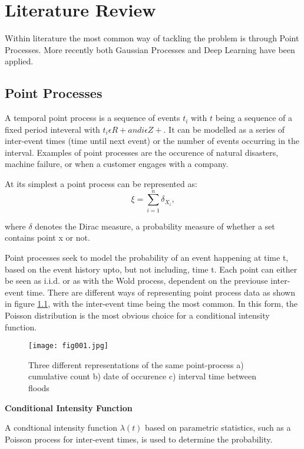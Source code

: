 
\chapter{Literature Review} %

\label{Chapter2} %

Within literature the most common way of tackling the problem is through Point Processes. More recently both Gaussian Processes and Deep Learning have been applied.

\section{Point Processes}
A temporal point process is a sequence of events ${t_i}$ with $t$ being a sequence of a fixed period inteveral with $t_i \epsilon R + and i \epsilon Z+$. It can be modelled as a series of inter-event times (time until next event) or the number of events occurring in the interval. Examples of point processes are the occurence of natural disasters, machine failure, or when a customer engages with a company.

At its simplest a point process can be represented as:
$${\xi =\sum _{i=1}^{n}\delta _{X_{i}},}$$

where $\delta$ denotes the Dirac measure, a probability measure of whether a set contains point x or not.

Point processes seek to model the probability of an event happening at time t, based on the event history upto, but not including, time t. Each point can either be seen as i.i.d. or as with the Wold process, dependent on the previouse inter-event time.
There are different ways of representing point process data as shown in figure \ref{fig:boat1}, with the inter-event time being the most common. In this form, the Poisson distribution is the most obvious choice for a conditional intensity function.

\begin{figure}[h!]
	\texttt{[image: fig001.jpg]}
	\caption{Three different representations of the same point-process a) cumulative count b) date of occurence c) interval time between floods}
	\label{fig:boat1}
\end{figure}

\textbf{Conditional Intensity Function} 

A condtional intensity function $\lambda(t)$ based on parametric statistics, such as a Poisson process for inter-event times, is used to determine the probability. 

